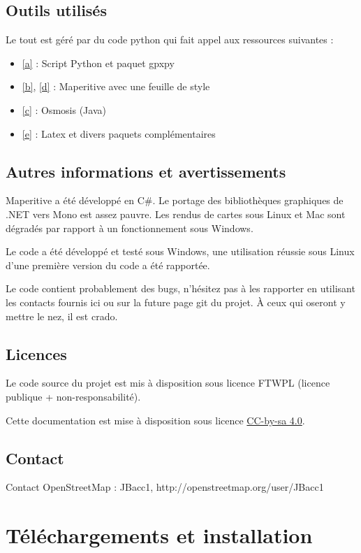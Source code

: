\documentclass[12pt,french]{article}
\begin{document}
\subsection{Outils utilisés}
Le tout est géré par du code python qui fait appel aux ressources suivantes :
\begin{itemize}
\item \ref{a} : Script Python et paquet gpxpy
\item \ref{b}, \ref{d} : Maperitive avec une feuille de style
\item \ref{c} : Osmosis (Java)
\item \ref{e} : Latex et divers paquets complémentaires
\end{itemize}

\subsection{Autres informations et avertissements}
Maperitive a été développé en C\#. Le portage des bibliothèques graphiques de .NET vers Mono est assez pauvre. Les rendus de cartes sous Linux et Mac sont dégradés par rapport à un fonctionnement sous Windows.\par 
Le code a été développé et testé sous Windows, une utilisation réussie sous Linux d'une première version du code a été rapportée.\par 
Le code contient probablement des bugs, n'hésitez pas à les rapporter en utilisant les contacts fournis ici ou sur la future page git du projet. À ceux qui oseront y mettre le nez, il est crado.\par 
\subsection{Licences}
Le code source du projet est mis à disposition sous licence FTWPL (licence publique + non-responsabilité). \par 
Cette documentation est mise à disposition sous licence \href{https://creativecommons.org/licenses/by-sa/4.0/}{CC-by-sa 4.0}.
\subsection{Contact}
Contact OpenStreetMap : JBacc1, http://openstreetmap.org/user/JBacc1


\section{Téléchargements et installation}
\end{document}
